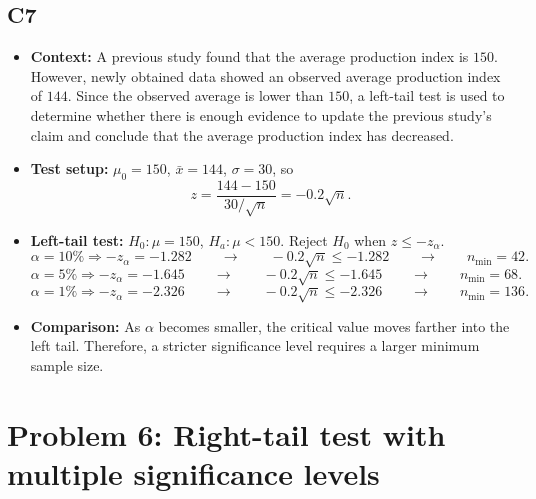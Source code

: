 \subsection*{C7}
\begin{itemize}
	\item \textbf{Context:} A previous study found that the average production index is \(150\). However, newly obtained data showed an observed average production index of \(144\). Since the observed average is lower than \(150\), a left-tail test is used to determine whether there is enough evidence to update the previous study's claim and conclude that the average production index has decreased.
	\item \textbf{Test setup:} \(\mu_0=150\), \(\bar x=144\), \(\sigma=30\), so
	\[
	z=\frac{144-150}{30/\sqrt n}=-0.2\sqrt n.
	\]
	\item \textbf{Left-tail test:} \(H_0:\mu=150\), \(H_a:\mu<150\). Reject \(H_0\) when \(z\le -z_{\alpha}\).
	\[
	\alpha=10\%\Rightarrow -z_{\alpha}=-1.282
	\qquad \longrightarrow \qquad
	-0.2\sqrt n\le-1.282
	\qquad \longrightarrow \qquad
	n_{\min}=42.
	\]
	\[
	\alpha=5\%\Rightarrow -z_{\alpha}=-1.645
	\qquad \longrightarrow \qquad
	-0.2\sqrt n\le-1.645
	\qquad \longrightarrow \qquad
	n_{\min}=68.
	\]
	\[
	\alpha=1\%\Rightarrow -z_{\alpha}=-2.326
	\qquad \longrightarrow \qquad
	-0.2\sqrt n\le-2.326
	\qquad \longrightarrow \qquad
	n_{\min}=136.
	\]
	\item \textbf{Comparison:} As \(\alpha\) becomes smaller, the critical value moves farther into the left tail. Therefore, a stricter significance level requires a larger minimum sample size.
\end{itemize}

\section{Problem 6: Right-tail test with multiple significance levels}
